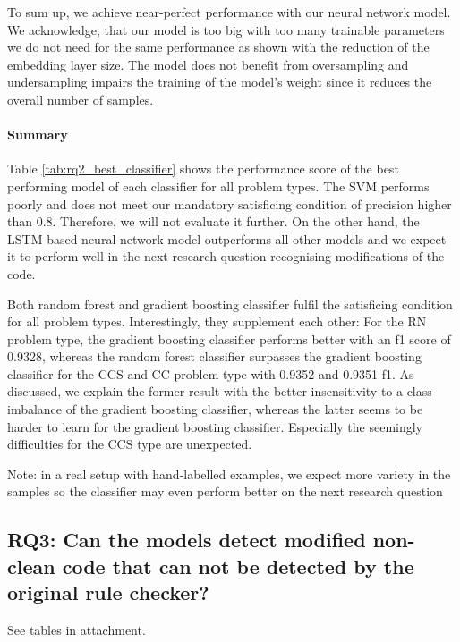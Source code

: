 To sum up, we achieve near-perfect performance with our neural network model. We acknowledge, that our model is too big with too many trainable parameters we do not need for the same performance as shown with the reduction of the embedding layer size. The model does not benefit from oversampling and undersampling impairs the training of the model's weight since it reduces the overall number of samples.

\paragraph{Summary}

 Table \ref{tab:rq2_best_classifier} shows the performance score of the best performing model of each classifier for all problem types.
 The SVM performs poorly and does not meet our mandatory satisficing condition of precision higher than 0.8. Therefore, we will not evaluate it further. On the other hand, the LSTM-based neural network model outperforms all other models and we expect it to perform well in the next research question recognising modifications of the code.

 Both random forest and gradient boosting classifier fulfil the satisficing condition for all problem types. Interestingly, they supplement each other: For the RN problem type, the gradient boosting classifier performs better with an f1 score of 0.9328, whereas the random forest classifier surpasses the gradient boosting classifier for the CCS and CC problem type with 0.9352 and 0.9351 f1. As discussed, we explain the former result with the better insensitivity to a class imbalance of the gradient boosting classifier, whereas the latter seems to be harder to learn for the gradient boosting classifier. Especially the seemingly difficulties for the CCS type are unexpected.
 
 Note: in a real setup with hand-labelled examples, we expect more variety in the samples so the classifier may even perform better on the next research question 


 \subsection{RQ3: Can the models detect modified non-clean code that can not be detected by the original rule checker? }
See tables in attachment.

